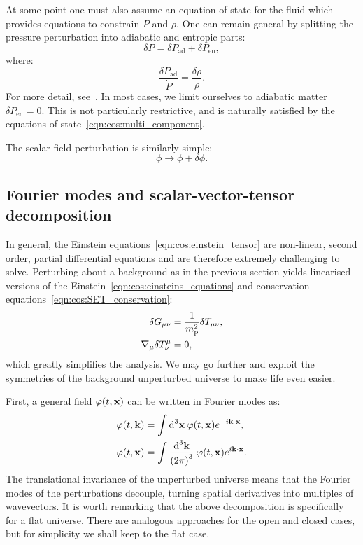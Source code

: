 At some point one must also assume an equation of state for the fluid which provides equations to constrain \(P\) and \(\rho\). One can remain general by splitting the pressure perturbation into adiabatic and entropic parts:
\begin{equation}
  \delta P = \delta P_\mathrm{ad} + \delta P_\mathrm{en},
  \label{eqn:cos:adiabatic_entropic}
\end{equation} 
where:
\begin{equation}
  \frac{\delta P_\mathrm{ad}}{\dot{P}} = \frac{\delta\rho}{\dot{\rho}}.
  \label{eqn:cos:adiabatic}
\end{equation} 
For more detail, see~\cite[p.~48]{Baumann+2009}. 
In most cases, we limit ourselves to adiabatic matter \(\delta P_\mathrm{en}=0\).
This is not particularly restrictive, and is naturally satisfied by the equations of state~\eqref{eqn:cos:multi_component}.

The scalar field perturbation is similarly simple:
\begin{equation}
  \phi \rightarrow \phi + \delta\phi.
\end{equation}

\subsection{Fourier modes and scalar-vector-tensor decomposition}
In general, the Einstein equations~\eqref{eqn:cos:einstein_tensor} are non-linear, second order, partial differential equations and are therefore extremely challenging to solve. Perturbing about a background as in the previous section yields linearised versions of the Einstein~\eqref{eqn:cos:einsteins_equations} and conservation equations~\eqref{eqn:cos:SET_conservation}:
\begin{align}
  \delta G_{\mu\nu} &= \frac{1}{\m^2}\delta T_{\mu\nu},
  \label{eqn:cos:einsteins_equations_perturb} \\
  \nabla_\mu\delta T^{\mu}_{\nu} &=0,
  \label{eqn:cos:SET_conservation_perturb}
\end{align}
which greatly simplifies the analysis.  
We may go further and exploit the symmetries of the background unperturbed universe to make life even easier.

First, a general field \(\varphi(t,\vx)\) can be written in Fourier modes as:
\begin{align}
  \varphi(t,\vk) &= \int \d[3]{\vx}\: \varphi(t,\vx) e^{-i\vk \cdot \vx},\\
  \varphi(t,\vx) &= \int \frac{\d[3]{\vk}}{{(2\pi)}^3}\: \varphi(t,\vx) e^{i\vk \cdot \vx}.
\end{align}
The translational invariance of the unperturbed universe means that the Fourier modes of the perturbations decouple, turning spatial derivatives into multiples of wavevectors. 
It is worth remarking that the above decomposition is specifically for a flat universe. There are analogous approaches for the open and closed cases, but for simplicity we shall keep to the flat case. 

